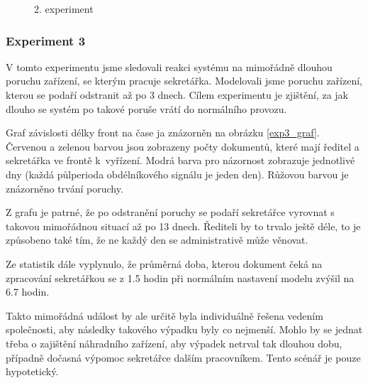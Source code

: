 \documentclass[12pt,a4paper]{article}
\begin{document}
\begin{figure}[ht]
 \begin{center}
    \caption{2. experiment }
    \label{exp2_histogram}
 \end{center}
\end{figure}

\subsubsection{Experiment 3}

V tomto experimentu jsme sledovali reakci systému na mimořádně dlouhou poruchu zařízení, se kterým pracuje sekretářka.
Modelovali jsme poruchu zařízení, kterou se podaří odstranit až po 3 dnech.
Cílem experimentu je zjištění, za jak dlouho se systém po takové poruše vrátí do normálního provozu.

Graf závislosti délky front na čase ja znázorněn na obrázku \ref{exp3_graf}. Červenou a zelenou barvou jsou zobrazeny
počty dokumentů, které mají ředitel a sekretářka ve frontě k~vyřízení. Modrá barva pro názornost zobrazuje jednotlivé
dny (každá půlperioda ob\-dél\-ní\-ko\-vé\-ho signálu je jeden den). Růžovou barvou je znázorněno trvání poruchy.

Z grafu je patrné, že po odstranění poruchy se podaří sekretářce vyrovnat s takovou mimořádnou situací až po 13 dnech. Řediteli by to trvalo ještě déle, to je způsobeno také tím, že ne každý den se administrativě může věnovat.

Ze statistik dále vyplynulo, že průměrná doba, kterou dokument čeká na zpracování sekretářkou se z 1.5 hodin při
normálním nastavení modelu zvýšil na 6.7 hodin.

Takto mimořádná událost by ale určitě byla individuálně řešena vedením společnosti, aby následky takového výpadku
byly co nejmenší. Mohlo by se jednat třeba o zajištění náhradního zařízení, aby výpadek netrval tak dlouhou dobu, případně
dočasná výpomoc sekretářce dalším pracovníkem. Tento scénář je pouze hypotetický.
\end{document}
